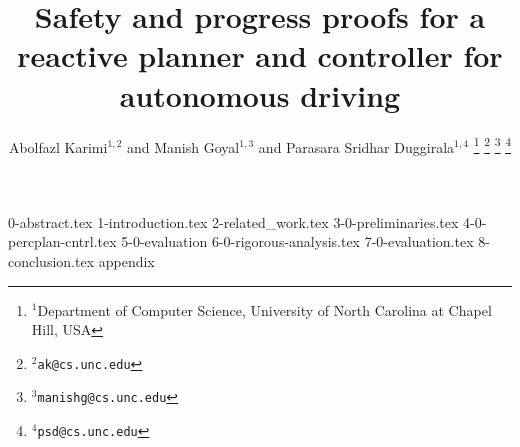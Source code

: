 \documentclass[letterpaper, 10 pt, conference]{ieeeconf}  %
\title{\LARGE \bf
Safety and progress proofs for a reactive planner and controller for autonomous driving
}
\author{Abolfazl Karimi$^{1,2}$ and Manish Goyal$^{1, 3}$ and Parasara Sridhar Duggirala$^{1, 4}$%
\thanks{$^{1}$Department of Computer Science, University of North Carolina at Chapel Hill, USA}%
\thanks{$^{2}${\tt\small ak@cs.unc.edu}}%
\thanks{$^{3}${\tt\small manishg@cs.unc.edu}}%
\thanks{$^{4}${\tt\small psd@cs.unc.edu}}%
}
\begin{document}
\maketitle
\thispagestyle{empty}
\pagestyle{empty}

{0-abstract.tex}
{1-introduction.tex}
{2-related_work.tex}
{3-0-preliminaries.tex}
{4-0-percplan-cntrl.tex}
{5-0-evaluation}
{6-0-rigorous-analysis.tex}
{7-0-evaluation.tex}
{8-conclusion.tex}
{appendix}



\end{document}
